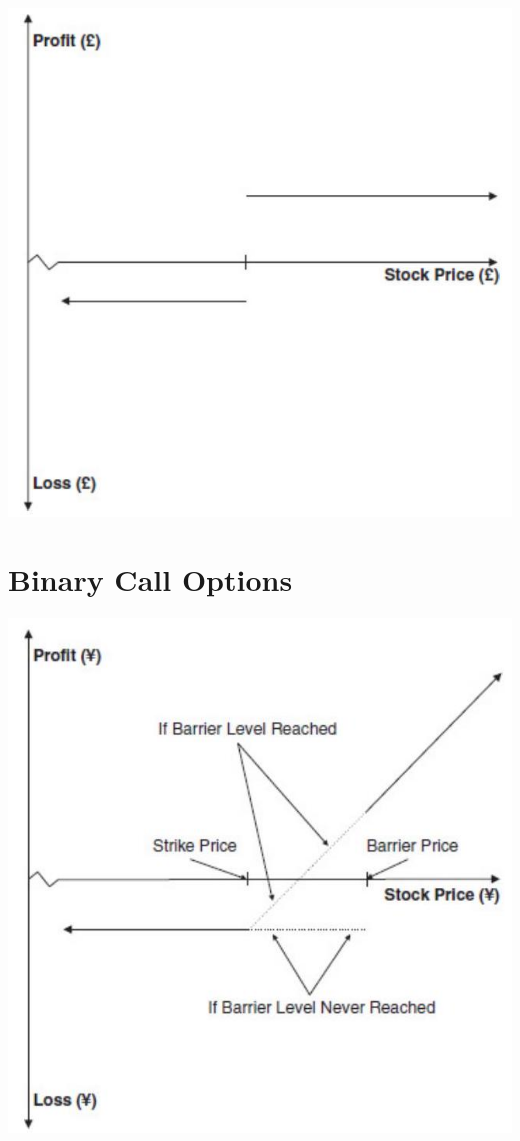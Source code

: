 \documentclass[11pt]{article}
\begin{document}
\begin{center}
\includegraphics[max width=\textwidth]{2024_04_10_71ad1a12f130097be485g-3}
\end{center}

\section*{Binary Call Options}
\begin{center}
\includegraphics[max width=\textwidth]{2024_04_10_71ad1a12f130097be485g-3(1)}
\end{center}
\end{document}
